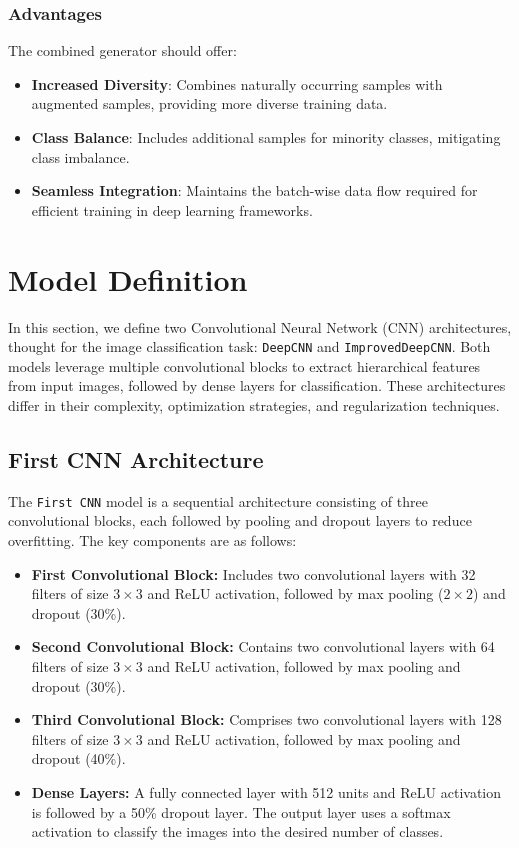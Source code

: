 \documentclass{article}
\begin{document}
\subsubsection{Advantages}

The combined generator should offer:
\begin{itemize}
    \item \textbf{Increased Diversity}: Combines naturally occurring samples with augmented samples, providing more diverse training data.
    \item \textbf{Class Balance}: Includes additional samples for minority classes, mitigating class imbalance.
    \item \textbf{Seamless Integration}: Maintains the batch-wise data flow required for efficient training in deep learning frameworks.
\end{itemize}

\section{Model Definition}

In this section, we define two Convolutional Neural Network (CNN) architectures, thought for the image classification task: \texttt{DeepCNN} and \texttt{ImprovedDeepCNN}. Both models leverage multiple convolutional blocks to extract hierarchical features from input images, followed by dense layers for classification. These architectures differ in their complexity, optimization strategies, and regularization techniques.

\subsection{First CNN Architecture}

The \texttt{First CNN} model is a sequential architecture consisting of three convolutional blocks, each followed by pooling and dropout layers to reduce overfitting. The key components are as follows:
\begin{itemize}
    \item \textbf{First Convolutional Block:} Includes two convolutional layers with 32 filters of size \(3 \times 3\) and ReLU activation, followed by max pooling (\(2 \times 2\)) and dropout (30\%).
    \item \textbf{Second Convolutional Block:} Contains two convolutional layers with 64 filters of size \(3 \times 3\) and ReLU activation, followed by max pooling and dropout (30\%).
    \item \textbf{Third Convolutional Block:} Comprises two convolutional layers with 128 filters of size \(3 \times 3\) and ReLU activation, followed by max pooling and dropout (40\%).
    \item \textbf{Dense Layers:} A fully connected layer with 512 units and ReLU activation is followed by a 50\% dropout layer. The output layer uses a softmax activation to classify the images into the desired number of classes.
\end{itemize}
\end{document}
